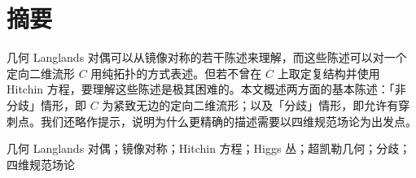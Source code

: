 \clearpage

\section*{摘要}

\noindent
几何 Langlands 对偶可以从镜像对称的若干陈述来理解，而这些陈述可以对一个定向二维流形 $C$ 用纯拓扑的方式表述。但若不曾在 $C$ 上取定复结构并使用 Hitchin 方程，要理解这些陈述是极其困难的。本文概述两方面的基本陈述：「非分歧」情形，即 $C$ 为紧致无边的定向二维流形；以及「分歧」情形，即允许有穿刺点。我们还略作提示，说明为什么更精确的描述需要以四维规范场论为出发点。

\vspace{0.9em}
几何 Langlands 对偶；镜像对称；Hitchin 方程；Higgs 丛；超凯勒几何；分歧；四维规范场论
